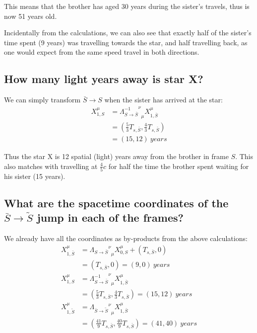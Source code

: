 \documentclass[a4paper]{scrartcl}
\begin{document}
This means that the brother has aged 30 years during the sister's travels, thus is now 51 years old.

Incidentally from the calculations, we can also see that exactly half of the sister's time spent (9 years) was travelling towards the star, and half travelling back, as one would expect from the same speed travel in both directions.

\subsection{How many light years away is star X?}
We can simply transform \(\bar{S} \to S\) when the sister has arrived at the star:
\begin{align*}
    X^\mu_{1, S} &= {{\Lambda_{S \to \bar{S}}^{-1}}^\nu}_\mu X^\mu_{1, \bar{S}} \\
    &= \left(\frac{5}{3} T_{s, \bar{S}}, \frac{4}{3} T_{s, \bar{S}}\right) \\
    &= (15, 12) \:\si{years}
\end{align*}

Thus the star X is 12 spatial (light) years away from the brother in frame \(S\). This also matches with travelling at \(\frac{4}{5} c\) for half the time the brother spent waiting for his sister (15 years).

\subsection{What are the spacetime coordinates of the \(\bar{S} \to \tilde{S}\) jump in each of the frames?}
We already have all the coordinates as by-products from the above calculations:
\begin{align*}
    X^\mu_{1, \bar{S}} &= {{\Lambda_{S \to \bar{S}}}^\nu}_\mu X^\mu_{0, S} + (T_{s, \bar{S}}, 0) \\
    &= (T_{s, \bar{S}}, 0) = (9, 0) \:\si{years} \\
    X^\mu_{1, S} &= {{\Lambda_{S \to \bar{S}}^{-1}}^\nu}_\mu X^\mu_{1, \bar{S}} \\
    &= \left(\frac{5}{3} T_{s, \bar{S}}, \frac{4}{3} T_{s, \bar{S}}\right) = (15, 12) \:\si{years} \\
    X^\mu_{1, \tilde{S}} &= {{\Lambda_{\bar{S} \to \tilde{S}}}^\nu}_\mu X^\mu_{1, \bar{S}} \\
    &= \left(\frac{41}{9} T_{s, \bar{S}}, \frac{40}{9} T_{s, \bar{S}}\right) = (41, 40) \:\si{years}
\end{align*}
\end{document}
